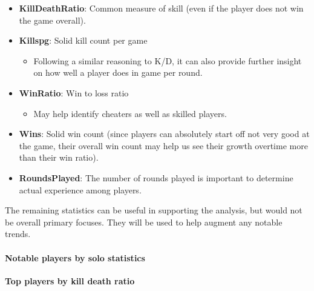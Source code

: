 \documentclass[]{article}
\providecommand{\tightlist}{%
  \setlength{\itemsep}{0pt}\setlength{\parskip}{0pt}}
\let\oldparagraph\paragraph
\renewcommand{\paragraph}[1]{\oldparagraph{#1}\mbox{}}
\begin{document}
\begin{itemize}
\tightlist
\item
  \textbf{KillDeathRatio}: Common measure of skill (even if the player
  does not win the game overall).
\item
  \textbf{Killspg}: Solid kill count per game

  \begin{itemize}
  \tightlist
  \item
    Following a similar reasoning to K/D, it can also provide further
    insight on how well a player does in game per round.
  \end{itemize}
\item
  \textbf{WinRatio}: Win to loss ratio

  \begin{itemize}
  \tightlist
  \item
    May help identify cheaters as well as skilled players.
  \end{itemize}
\item
  \textbf{Wins}: Solid win count (since players can absolutely start off
  not very good at the game, their overall win count may help us see
  their growth overtime more than their win ratio).
\item
  \textbf{RoundsPlayed}: The number of rounds played is important to
  determine actual experience among players.
\end{itemize}

The remaining statistics can be useful in supporting the analysis, but
would not be overall primary focuses. They will be used to help augment
any notable trends.

\paragraph{Notable players by solo
statistics}\label{notable-players-by-solo-statistics}

\textbf{Top players by kill death ratio}
\end{document}
